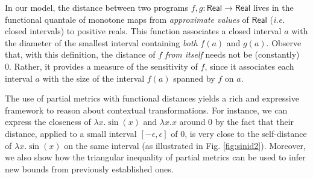 In our model, 
the distance between  two programs $f,g:\mathsf{Real}\to \mathsf{Real}$ lives in the functional quantale of monotone maps from \emph{approximate values} of $\mathsf{Real}$ (\emph{i.e.} closed intervals) to positive reals. This function associates a closed interval $a$ with the diameter of the smallest interval containing \emph{both} $f(a)$ and $g(a)$. 
Observe that, with this definition,  the distance of $f$ \emph{from itself} needs not be (constantly) 0. Rather, it  provides a measure of the sensitivity of $f$, since it associates each interval $a$ with the size of the interval $f(a)$ spanned by $f$ on $a$. %





The use of partial metrics with functional distances yields a rich and expressive framework to reason about  
contextual transformations. For instance, we can express the closeness of $\lambda x.\sin(x)$ and $\lambda x.x$ around 0 by the fact that their distance, applied to a small interval $[-\epsilon,\epsilon]$ of 0, is very close to the {self-distance} of
$\lambda x.\sin(x)$ on the same interval (as illustrated in Fig. \ref{fig:sinid2}). Moreover, we also show how the triangular inequality of partial metrics can be used to infer new bounds from previously established ones.

%

